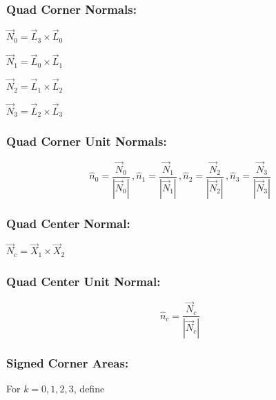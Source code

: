 \documentclass[12pt]{article}
\begin{document}
\subsubsection*{Quad Corner Normals:}

\begin{center}
$\vec N_0 = \vec L_3 \times \vec L_0 $
\end{center}
\begin{center}
$\vec N_1 = \vec L_0 \times \vec L_1 $
\end{center}
\begin{center}
$\vec N_2 = \vec L_1 \times \vec L_2 $
\end{center}
\begin{center}
$\vec N_3 = \vec L_2 \times \vec L_3 $
\end{center}

\subsubsection*{Quad Corner Unit Normals:}

\begin{displaymath}
\hat n_0 = \frac{\vec N_0}{| \vec N_0 |} \,, 
\hat n_1 = \frac{\vec N_1}{| \vec N_1 |} \,,
\hat n_2 = \frac{\vec N_2}{| \vec N_2 |} \,,
\hat n_3 = \frac{\vec N_3}{| \vec N_3 |} 
\end{displaymath}

\subsubsection*{Quad Center Normal:}

\begin{center}
$ \vec N_{c} = \vec X_1 \times \vec X_2 $
\end{center}

\subsubsection*{Quad Center Unit Normal:}

\begin{displaymath}
\hat n_{c} = \frac{\vec N_{c}}{| \vec N_{c} |}
\end{displaymath}

\subsubsection*{Signed Corner Areas:}

For $k=0,1,2,3$, define
\end{document}
